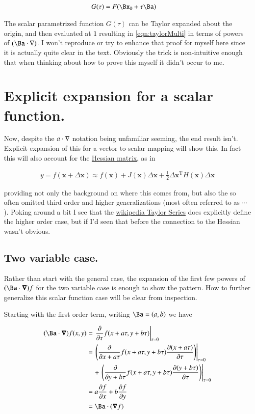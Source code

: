 \documentclass{article}
\begin{document}
\begin{align}
G(\tau) &= F(\Bx_0 + \tau\Ba)
\end{align}

The scalar parametrized function $G(\tau)$ can be Taylor expanded about
the origin, and then evaluated at $1$ resulting in 
\ref{eqn:taylorMulti} in terms of powers of $(\Ba \cdot \grad)$.  
I won't reproduce or try to
enhance that proof for myself here since it is actually 
quite clear in the text.  Obviously the trick is non-intuitive enough
that when thinking about how to prove this myself it didn't occur to me.

\section{ Explicit expansion for a scalar function. }

Now, despite the $a \cdot \nabla$ notation being unfamiliar seeming, the 
end result isn't.  Explicit expansion of this for a vector to scalar mapping
will show this.  In fact this will also account for the 
\href{http://en.wikipedia.org/wiki/Hessian_matrix}{Hessian matrix}, as in

\begin{align*}
y=f(\mathbf{x}+\Delta\mathbf{x})\approx f(\mathbf{x}) + J(\mathbf{x})\Delta \mathbf{x} +\frac{1}{2} \Delta\mathbf{x}^\mathrm{T} H(\mathbf{x}) \Delta\mathbf{x}
\end{align*}

providing
not only the background on where this comes from, but also the so often
omitted third order and higher generalizations (most often referred to as $\cdots$).  Poking around a bit I see that the \href{http://en.wikipedia.org/wiki/Taylor_expansion}{wikipedia Taylor Series} does explicitly define the higher order case, but if 
I'd seen that before the connection to the Hessian wasn't obvious.

\subsection{ Two variable case. }

Rather than start with the general case, the expansion of the first few powers
of $(\Ba \cdot \spacegrad) f$ for the two variable case is enough to show the pattern.
How to further generalize this scalar function case will be clear from 
inspection.

Starting with the first order term, writing $\Ba = (a,b)$ we have

\begin{align*}
(\Ba \cdot \spacegrad) f(x,y) 
&= \left. \PD{\tau}{} f(x + a\tau, y + b\tau) \right\vert_{\tau=0} \\
&= 
\left. \left( \PD{x + a\tau}{} f(x + a\tau, y + b\tau) \PD{\tau}{(x + a\tau)} \right) \right\vert_{\tau=0} \\
&\quad+\left. \left( \PD{y + b\tau}{} f(x + a\tau, y + b\tau) \PD{\tau}{(y + b\tau)} \right) \right\vert_{\tau=0} \\
&= 
a \PD{x}{f} +b \PD{y}{f} \\
&= 
\Ba \cdot (\spacegrad f)
\end{align*}
\end{document}
